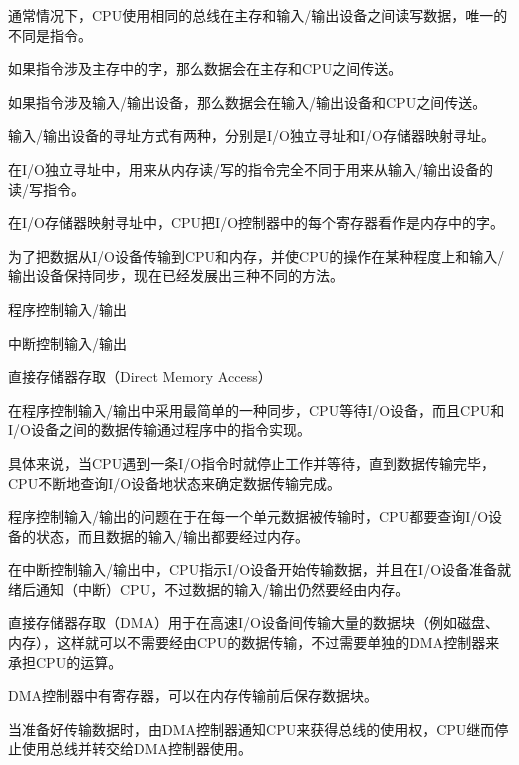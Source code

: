 通常情况下，CPU使用相同的总线在主存和输入/输出设备之间读写数据，唯一的不同是指令。

\begin{compactitem}
\item 如果指令涉及主存中的字，那么数据会在主存和CPU之间传送。
\item 如果指令涉及输入/输出设备，那么数据会在输入/输出设备和CPU之间传送。
\end{compactitem}


输入/输出设备的寻址方式有两种，分别是I/O独立寻址和I/O存储器映射寻址。

\begin{compactitem}
\item 在I/O独立寻址中，用来从内存读/写的指令完全不同于用来从输入/输出设备的读/写指令。
\item 在I/O存储器映射寻址中，CPU把I/O控制器中的每个寄存器看作是内存中的字。
\end{compactitem}

为了把数据从I/O设备传输到CPU和内存，并使CPU的操作在某种程度上和输入/输出设备保持同步，现在已经发展出三种不同的方法。

\begin{compactitem}
\item 程序控制输入/输出
\item 中断控制输入/输出
\item 直接存储器存取（Direct Memory Access）
\end{compactitem}

在程序控制输入/输出中采用最简单的一种同步，CPU等待I/O设备，而且CPU和I/O设备之间的数据传输通过程序中的指令实现。

具体来说，当CPU遇到一条I/O指令时就停止工作并等待，直到数据传输完毕，CPU不断地查询I/O设备地状态来确定数据传输完成。

程序控制输入/输出的问题在于在每一个单元数据被传输时，CPU都要查询I/O设备的状态，而且数据的输入/输出都要经过内存。

在中断控制输入/输出中，CPU指示I/O设备开始传输数据，并且在I/O设备准备就绪后通知（中断）CPU，不过数据的输入/输出仍然要经由内存。

直接存储器存取（DMA）用于在高速I/O设备间传输大量的数据块（例如磁盘、内存），这样就可以不需要经由CPU的数据传输，不过需要单独的DMA控制器来承担CPU的运算。

DMA控制器中有寄存器，可以在内存传输前后保存数据块。

当准备好传输数据时，由DMA控制器通知CPU来获得总线的使用权，CPU继而停止使用总线并转交给DMA控制器使用。

